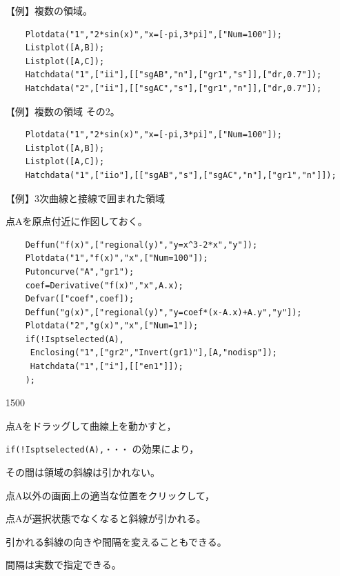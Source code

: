 \documentclass[papersize,a4paper,12pt,uplatex]{jsarticle}
\begin{document}
\begin{description}
【例】複数の領域。
\begin{verbatim}
    Plotdata("1","2*sin(x)","x=[-pi,3*pi]",["Num=100"]);
    Listplot([A,B]);
    Listplot([A,C]);
    Hatchdata("1",["ii"],[["sgAB","n"],["gr1","s"]],["dr,0.7"]);
    Hatchdata("2",["ii"],[["sgAC","s"],["gr1","n"]],["dr,0.7"]);
\end{verbatim}
\begin{center}
\begin{center}  \end{center}
\end{center}

【例】複数の領域  その2。
\begin{verbatim}
    Plotdata("1","2*sin(x)","x=[-pi,3*pi]",["Num=100"]);
    Listplot([A,B]);
    Listplot([A,C]);
    Hatchdata("1",["iio"],[["sgAB","s"],["sgAC","n"],["gr1","n"]]);
\end{verbatim}
\begin{center}
\begin{center}  \end{center}
\end{center}


【例】3次曲線と接線で囲まれた領域

    点Aを原点付近に作図しておく。
\begin{verbatim}
    Deffun("f(x)",["regional(y)","y=x^3-2*x","y"]);
    Plotdata("1","f(x)","x",["Num=100"]);
    Putoncurve("A","gr1");
    coef=Derivative("f(x)","x",A.x);
    Defvar(["coef",coef]);
    Deffun("g(x)",["regional(y)","y=coef*(x-A.x)+A.y","y"]);
    Plotdata("2","g(x)","x",["Num=1"]);
    if(!Isptselected(A),
     Enclosing("1",["gr2","Invert(gr1)"],[A,"nodisp"]);
     Hatchdata("1",["i"],[["en1"]]);
    );

\end{verbatim}
\begin{layer}{150}{0}
\end{layer}

点Aをドラッグして曲線上を動かすと，

\verb|if(!Isptselected(A),・・・| の効果により，

その間は領域の斜線は引かれない。

点A以外の画面上の適当な位置をクリックして，

点Aが選択状態でなくなると斜線が引かれる。

引かれる斜線の向きや間隔を変えることもできる。

間隔は実数で指定できる。


\end{description}
\end{document}
